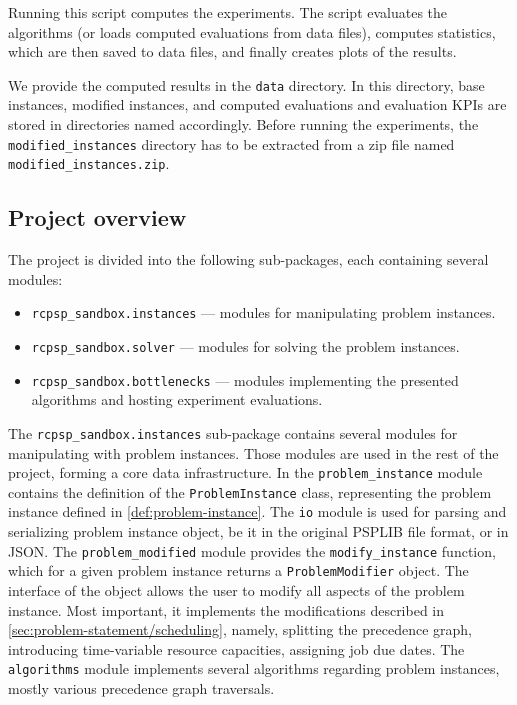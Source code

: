 Running this script computes the experiments.
The script evaluates the algorithms (or loads computed evaluations from data files),
computes statistics, which are then saved to data files,
and finally creates plots of the results.

We provide the computed results in the \texttt{data} directory.
In this directory, base instances, modified instances,
and computed evaluations and evaluation KPIs are stored
in directories named accordingly.
Before running the experiments, the \texttt{modified\_instances} directory has to be extracted
from a zip file named \texttt{modified\_instances.zip}.

\subsection{Project overview}

The project is divided into the following sub-packages, each containing several modules:

\begin{itemize}
    \item \texttt{rcpsp\_sandbox.instances} --- modules for manipulating problem instances.
    \item \texttt{rcpsp\_sandbox.solver} --- modules for solving the problem instances.
    \item \texttt{rcpsp\_sandbox.bottlenecks} --- modules implementing the presented algorithms
        and hosting experiment evaluations.
\end{itemize}

The \texttt{rcpsp\_sandbox.instances} sub-package contains several modules for manipulating with problem instances.
Those modules are used in the rest of the project, forming a core data infrastructure.
In the \texttt{problem\_instance} module contains the definition of the \texttt{ProblemInstance}
class, representing the problem instance defined in \cref{def:problem-instance}.
The \texttt{io} module is used for parsing and serializing problem instance object,
be it in the original PSPLIB file format, or in JSON.
The \texttt{problem\_modified} module provides the \texttt{modify\_instance} function,
which for a given problem instance returns a \texttt{ProblemModifier} object.
The interface of the object allows the user to modify all aspects of the problem instance.
Most important, it implements the modifications described in \cref{sec:problem-statement/scheduling},
namely, splitting the precedence graph, introducing time-variable resource capacities,
assigning job due dates.
The \texttt{algorithms} module implements several algorithms regarding problem instances,
mostly various precedence graph traversals.


